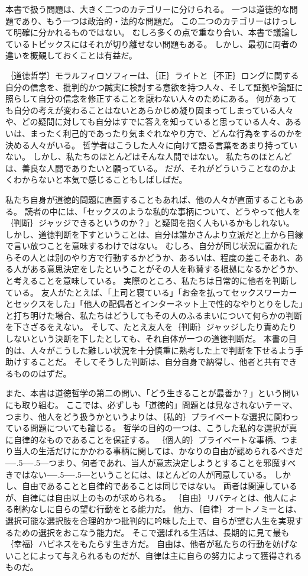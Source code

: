 \documentclass[paper=a4,book,openany]{jlreq}
\def\DDASH{―\kern-.5\zw―\kern-.5\zw―} %
\begin{document}
本書で扱う問題は、大きく二つのカテゴリーに分けられる。
一つは道徳的な問題であり、もう一つは政治的・法的な問題だ。
この二つのカテゴリーはけっして明確に分かれるものではない。
むしろ多くの点で重なり合い、本書で議論しているトピックスにはそれが切り離せない問題もある。
しかし、最初に両者の違いを概観しておくことは有益だ。

｛道徳哲学｝{モラルフィロソフィー}は、｛正｝{ライト}と｛不正｝{ロング}に関する自分の信念を、批判的かつ誠実に検討する意欲を持つ人々、そして証拠や論証に照らして自分の信念を修正することを厭わない人々のためにある。
何があっても自分の考えが変わることはないとあらかじめ凝り固まってしまっている人々や、どの疑問に対しても自分はすでに答えを知っていると思っている人々、あるいは、まったく利己的であったり気まぐれなやり方で、どんな行為をするのかを決める人々がいる。
哲学者はこうした人々に向けて語る言葉をあまり持っていない。
しかし、私たちのほとんどはそんな人間ではない。
私たちのほとんどは、善良な人間でありたいと願っている。
だが、それがどういうことなのかよくわからないと本気で感じることもしばしばだ。

私たち自身が道徳的問題に直面することもあれば、他の人々が直面することもある。
読者の中には、「セックスのような私的な事柄について、どうやって他人を｛判断｝{ジャッジ}できるというのか？」と疑問を抱く人もいるかもしれない。
しかし、道徳判断を下すということは、自分は誰かさんより立派だと上から目線で言い放つことを意味するわけではない。
むしろ、自分が同じ状況に置かれたらその人とは別のやり方で行動するかどうか、あるいは、程度の差こそあれ、ある人がある意思決定をしたということがその人を称賛する根拠になるかどうか、と考えることを意味している。
実際のところ、私たちは日常的に他者を判断している。
友人がたとえば、「上司と寝ている」「お金を払ってセックスワーカーとセックスをした」「他人の配偶者とインターネット上で性的なやりとりをした」と打ち明けた場合、私たちはどうしてもその人のふるまいについて何らかの判断を下さざるをえない。
そして、たとえ友人を｛判断｝{ジャッジ}したり責めたりしないという決断を下したとしても、それ自体が一つの道徳判断だ。
本書の目的は、人々がこうした難しい状況を十分慎重に熟考した上で判断を下せるよう手助けすることだ。
そしてそうした判断は、自分自身で納得し、他者と共有できるもののはずだ。

また、本書は道徳哲学の第二の問い、「どう生きることが最善か？」という問いにも取り組む。
ここでは、必ずしも「道徳的」問題とは見なされないテーマ、つまり、他人をどう扱うかというよりは、｛私的｝{プライベート}な選択に関わっている問題についても論じる。
哲学の目的の一つは、こうした私的な選択が真に自律的なものであることを保証する。
｛個人的｝{プライベート}な事柄、つまり当人の生活だけにかかわる事柄に関しては、かなりの自由が認められるべきだ{\DDASH}つまり、何者であれ、当人が意志決定しようとすることを邪魔すべきではない{\DDASH}ということには、ほとんどの人が同意している。
しかし、自由であることと自律的であることは同じではない。
両者は関連しているが、自律には自由以上のものが求められる。
｛自由｝{リバティ}とは、他人による制約なしに自らの望む行動をとる能力だ。
他方、｛自律｝{オートノミー}とは、選択可能な選択肢を合理的かつ批判的に吟味した上で、自らが望む人生を実現するための選択をおこなう能力だ。
そこで選ばれる生活は、長期的に見て最も｛幸福｝{ハピネス}をもたらす生き方だ。
自由は、他者が私たちの行動を妨げないことによって与えられるものだが、自律は主に自らの努力によって獲得されるものだ。
\end{document}
